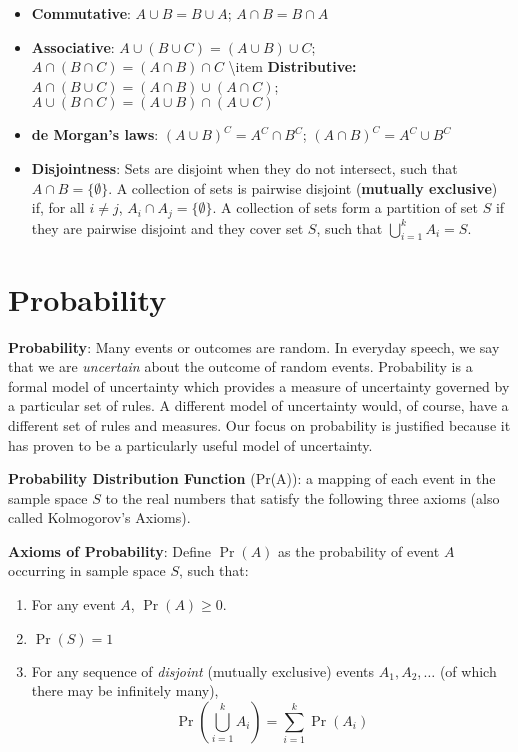 \documentclass[]{book}
\providecommand{\tightlist}{%
  \setlength{\itemsep}{0pt}\setlength{\parskip}{0pt}}
\theoremstyle{definition}
\theoremstyle{definition}
\theoremstyle{definition}
\theoremstyle{remark}
\begin{document}
\begin{itemize}
\tightlist
\item
  \textbf{Commutative}: \(A \cup B = B \cup A\); \(A \cap B = B \cap A\)
\item
  \textbf{Associative}: \(A \cup (B \cup C) = (A \cup B) \cup C\);
  \(A \cap (B \cap C) = (A \cap B) \cap C\) \textbackslash{}item
  \textbf{Distributive: }\(A \cap (B \cup C) = (A \cap B) \cup (A \cap C)\);
  \(A \cup (B \cap C) = (A \cup B) \cap (A \cup C)\)
\item
  \textbf{de Morgan's laws}: \((A \cup B)^C = A^C \cap B^C\);
  \((A \cap B)^C = A^C \cup B^C\)
\item
  \textbf{Disjointness}: Sets are disjoint when they do not intersect,
  such that \(A \cap B = \{\emptyset\}\). A collection of sets is
  pairwise disjoint (\textbf{mutually exclusive}) if, for all
  \(i \neq j\), \(A_i \cap A_j = \{\emptyset\}\). A collection of sets
  form a partition of set \(S\) if they are pairwise disjoint and they
  cover set \(S\), such that \(\bigcup_{i = 1}^k A_i = S\).
\end{itemize}

\section{Probability}\label{probability-1}

\textbf{Probability}: Many events or outcomes are random. In everyday
speech, we say that we are \emph{uncertain} about the outcome of random
events. Probability is a formal model of uncertainty which provides a
measure of uncertainty governed by a particular set of rules. A
different model of uncertainty would, of course, have a different set of
rules and measures. Our focus on probability is justified because it has
proven to be a particularly useful model of uncertainty.

\textbf{Probability Distribution Function} (Pr(A)): a mapping of each
event in the sample space \(S\) to the real numbers that satisfy the
following three axioms (also called Kolmogorov's Axioms).

\textbf{Axioms of Probability}: Define \(\Pr(A)\) as the probability of
event \(A\) occurring in sample space \(S\), such that:

\begin{enumerate}
\def\labelenumi{\arabic{enumi}.}
\tightlist
\item
  For any event \(A\), \(\Pr(A)\ge 0\).
\item
  \(\Pr(S)=1\)
\item
  For any sequence of \textit{disjoint} (mutually exclusive) events
  \(A_1,A_2,\ldots\) (of which there may be infinitely many),
  \[\Pr\left( \bigcup\limits_{i=1}^k
  A_i\right)=\sum\limits_{i=1}^k \Pr(A_i)\]
\end{enumerate}
\end{document}
